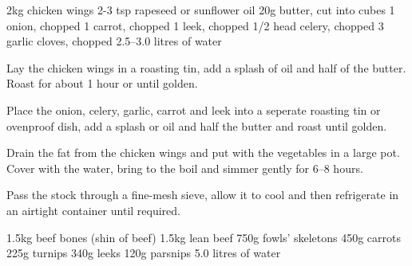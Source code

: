 \label{rec:chicken-stock}
\begin{ingreds}
	2kg chicken wings
     	2-3 tsp rapeseed or sunflower oil
     	20g butter, cut into cubes
     	1 onion, chopped
    	1 carrot, chopped
	1 leek, chopped
	1/2 head celery, chopped
	3 garlic cloves, chopped
	2.5--3.0 litres of water
\end{ingreds}

\begin{method}
     	Lay the chicken wings in a roasting tin, add a splash of oil and half of the butter.  Roast for about 1 hour or until golden.

    	Place the onion, celery, garlic, carrot and leek into a seperate roasting tin or ovenproof dish, add a splash or oil and half the butter and roast until golden.

   	Drain the fat from the chicken wings and put with the vegetables in a large pot.  Cover with the water, bring to the boil and simmer gently for 6--8 hours.

	Pass the stock through a fine-mesh sieve, allow it to cool and then refrigerate in an airtight container until required.
\end {method}

\label{rec:chicken-stock}
\begin{ingreds}
	1.5kg beef bones (shin of beef)
	1.5kg lean beef
	750g fowls' skeletons
	450g carrots
	225g turnips
	340g leeks
	120g parsnips
	5.0 litres of water
\end{ingreds}

